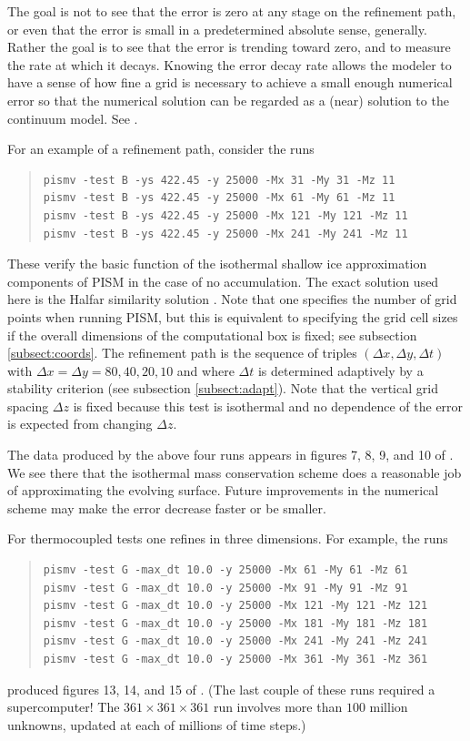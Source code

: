 \documentclass[11pt,final]{amsart}
\begin{document}
The goal is not to see that the error is zero at any stage on the refinement path, or even that the error is small in a predetermined absolute sense, generally.  Rather the goal is to see that the error is trending toward zero, and to measure the rate at which it decays.  Knowing the error decay rate allows the modeler to have a sense of how fine a grid is necessary to achieve a small enough numerical error so that the numerical solution can be regarded as a (near) solution to the continuum model.  See \cite{BLKCB,BBL,Roache,Wesseling}.

For an example of a refinement path, consider the runs
\begin{quote}\small\begin{verbatim}
pismv -test B -ys 422.45 -y 25000 -Mx 31 -My 31 -Mz 11
pismv -test B -ys 422.45 -y 25000 -Mx 61 -My 61 -Mz 11
pismv -test B -ys 422.45 -y 25000 -Mx 121 -My 121 -Mz 11
pismv -test B -ys 422.45 -y 25000 -Mx 241 -My 241 -Mz 11
\end{verbatim}
\normalsize\end{quote}
These verify the basic function of the isothermal shallow ice approximation components of PISM in the case of no accumulation.  The exact solution used here is the Halfar similarity solution \cite{Halfar83}.  Note that one specifies the number of grid points when running PISM, but this is equivalent to specifying the grid cell sizes if the overall dimensions of the computational box is fixed; see subsection \ref{subsect:coords}.  The refinement path is the sequence of triples $(\Delta x,\Delta y,\Delta t)$ with $\Delta x = \Delta y = 80,40,20,10$ and where $\Delta t$ is determined adaptively by a stability criterion (see subsection \ref{subsect:adapt}).  Note that the vertical grid spacing $\Delta z$ is fixed because this test is isothermal and no dependence of the error is expected from changing $\Delta z$.

The data produced by the above four runs appears in figures 7, 8, 9, and 10 of \cite{BLKCB}.  We see there that the isothermal mass conservation scheme does a reasonable job of approximating the evolving surface.  Future improvements in the numerical scheme may make the error decrease faster or be smaller.

For thermocoupled tests one refines in three dimensions.  For example, the runs
\begin{quote}\small\begin{verbatim}
pismv -test G -max_dt 10.0 -y 25000 -Mx 61 -My 61 -Mz 61
pismv -test G -max_dt 10.0 -y 25000 -Mx 91 -My 91 -Mz 91
pismv -test G -max_dt 10.0 -y 25000 -Mx 121 -My 121 -Mz 121
pismv -test G -max_dt 10.0 -y 25000 -Mx 181 -My 181 -Mz 181
pismv -test G -max_dt 10.0 -y 25000 -Mx 241 -My 241 -Mz 241
pismv -test G -max_dt 10.0 -y 25000 -Mx 361 -My 361 -Mz 361
\end{verbatim}
\normalsize\end{quote}
produced figures 13, 14, and 15 of \cite{BBL}.  (The last couple of these runs required a supercomputer!  The $361\times 361\times 361$ run involves more than $100$ million unknowns, updated at each of millions of time steps.)
\end{document}
